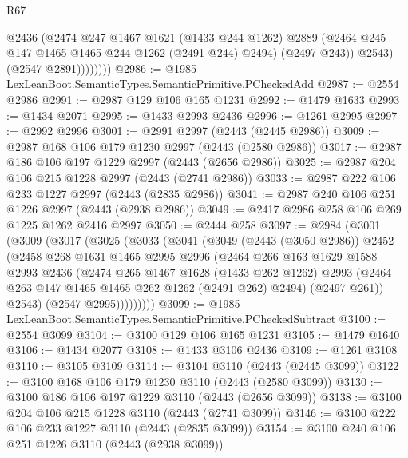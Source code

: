 \begin{lexlean}{R67}
\begin{coremodule}
                    @2436
                    (@2474
                      @247
                      @1467
                      @1621
                      (@1433 @244 @1262)
                      @2889
                      (@2464 @245 @147 @1465 @1465 @244 @1262 (@2491 @244) @2494)
                      (@2497 @243))
                    @2543)
                  (@2547 @2891))))))))
@2986 := @1985 LexLeanBoot.SemanticTypes.SemanticPrimitive.PCheckedAdd
@2987 := @2554 @2986
@2991 := @2987 @129 @106 @165 @1231
@2992 := @1479 @1633
@2993 := @1434 @2071
@2995 := @1433 @2993 @2436
@2996 := @1261 @2995
@2997 := @2992 @2996
@3001 := @2991 @2997 (@2443 (@2445 @2986))
@3009 := @2987 @168 @106 @179 @1230 @2997 (@2443 (@2580 @2986))
@3017 := @2987 @186 @106 @197 @1229 @2997 (@2443 (@2656 @2986))
@3025 := @2987 @204 @106 @215 @1228 @2997 (@2443 (@2741 @2986))
@3033 := @2987 @222 @106 @233 @1227 @2997 (@2443 (@2835 @2986))
@3041 := @2987 @240 @106 @251 @1226 @2997 (@2443 (@2938 @2986))
@3049 := @2417 @2986 @258 @106 @269 @1225 @1262 @2416 @2997
@3050 := @2444 @258
@3097 := @2984
    (@3001
      (@3009
        (@3017
          (@3025
            (@3033
              (@3041
                (@3049
                  (@2443 (@3050 @2986))
                  @2452
                  (@2458
                    @268
                    @1631
                    @1465
                    @2995
                    @2996
                    (@2464
                      @266
                      @163
                      @1629
                      @1588
                      @2993
                      @2436
                      (@2474
                        @265
                        @1467
                        @1628
                        (@1433 @262 @1262)
                        @2993
                        (@2464 @263 @147 @1465 @1465 @262 @1262 (@2491 @262) @2494)
                        (@2497 @261))
                      @2543)
                    (@2547 @2995)))))))))
@3099 := @1985 LexLeanBoot.SemanticTypes.SemanticPrimitive.PCheckedSubtract
@3100 := @2554 @3099
@3104 := @3100 @129 @106 @165 @1231
@3105 := @1479 @1640
@3106 := @1434 @2077
@3108 := @1433 @3106 @2436
@3109 := @1261 @3108
@3110 := @3105 @3109
@3114 := @3104 @3110 (@2443 (@2445 @3099))
@3122 := @3100 @168 @106 @179 @1230 @3110 (@2443 (@2580 @3099))
@3130 := @3100 @186 @106 @197 @1229 @3110 (@2443 (@2656 @3099))
@3138 := @3100 @204 @106 @215 @1228 @3110 (@2443 (@2741 @3099))
@3146 := @3100 @222 @106 @233 @1227 @3110 (@2443 (@2835 @3099))
@3154 := @3100 @240 @106 @251 @1226 @3110 (@2443 (@2938 @3099))

\end{coremodule}
\end{lexlean}
